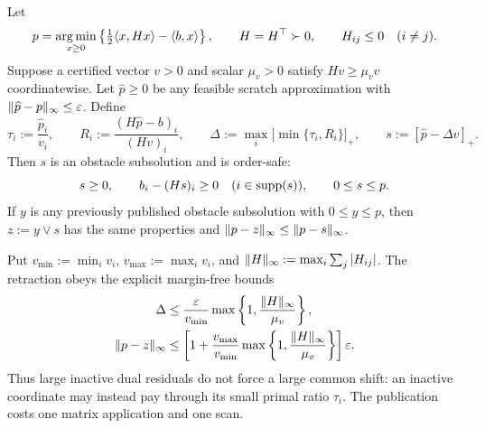 \begin{theorem}
\label{thm:aesp-cd-obstacle-clip-retraction}
Let
\begin{equation*}
 p=\operatorname*{arg\,min}_{x\geq0}\left\{
   \tfrac12\langle x,Hx\rangle-\langle b,x\rangle\right\},
 \qquad
 H=H^\top\succ0,
 \qquad H_{ij}\leq0\quad(i\neq j).
\end{equation*}
Suppose a certified vector $v>0$ and scalar $\mu_v>0$ satisfy
$Hv\geq\mu_vv$ coordinatewise.  Let $\widehat p\geq0$ be any feasible
scratch approximation with
$\lVert\widehat p-p\rVert_\infty\leq\varepsilon$.  Define
\begin{equation}
 \tau_i:=\frac{\widehat p_i}{v_i},\qquad
 R_i:=\frac{(H\widehat p-b)_i}{(Hv)_i},\qquad
 \Delta:=\max_i\bigl[\min\{\tau_i,R_i\}\bigr]_+,
 \qquad
 s:=[\widehat p-\Delta v]_+.
 \label{eq:aesp-cd-obstacle-clip-pay}
\end{equation}
Then $s$ is an obstacle subsolution and is order-safe:
\begin{equation}
 s\geq0,\qquad b_i-(Hs)_i\geq0\quad(i\in\operatorname{supp}(s)),
 \qquad 0\leq s\leq p.
 \label{eq:aesp-cd-obstacle-clip-pay-safe}
\end{equation}
If $y$ is any previously published obstacle subsolution with
$0\leq y\leq p$, then $z:=y\vee s$ has the same properties and
$\lVert p-z\rVert_\infty\leq\lVert p-s\rVert_\infty$.

Put $v_{\min}:=\min_i v_i$, $v_{\max}:=\max_i v_i$, and
$\lVert H\rVert_\infty:=\max_i\sum_j|H_{ij}|$.  The retraction obeys the explicit
margin-free bounds
\begin{align}
 \Delta
 &\leq \frac{\varepsilon}{v_{\min}}
   \max\left\{1,\frac{\lVert H\rVert_\infty}{\mu_v}\right\},
 \label{eq:aesp-cd-obstacle-clip-pay-delta}\\
 \lVert p-z\rVert_\infty
 &\leq
 \left[1+\frac{v_{\max}}{v_{\min}}
   \max\left\{1,\frac{\lVert H\rVert_\infty}{\mu_v}\right\}\right]\varepsilon.
 \label{eq:aesp-cd-obstacle-clip-pay-error}
\end{align}
Thus large inactive dual residuals do not force a large common shift: an
inactive coordinate may instead pay through its small primal ratio $\tau_i$.
The publication costs one matrix application and one scan.
\end{theorem}

